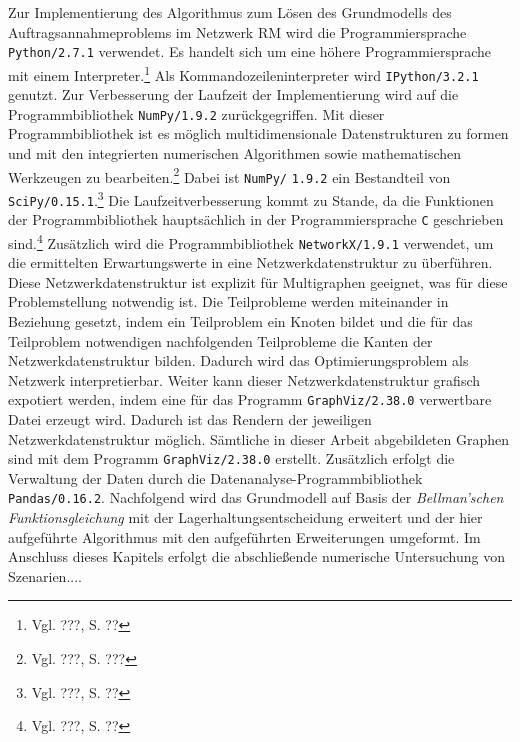 Zur Implementierung des Algorithmus zum Lösen des Grundmodells des Auftragsannahmeproblems im Netzwerk RM wird die Programmiersprache \texttt{Python/2.7.1} verwendet. Es handelt sich um eine höhere Programmiersprache mit einem Interpreter.\footnote{Vgl. ???, S. ??} Als  Kommandozeileninterpreter wird \texttt{IPython/3.2.1} genutzt. Zur Verbesserung der Laufzeit der Implementierung wird auf die Programmbibliothek \texttt{NumPy/}\texttt{1.9.2} zurückgegriffen. Mit dieser Programmbibliothek ist es möglich multidimensionale Datenstrukturen zu formen und mit den integrierten numerischen Algorithmen sowie mathematischen Werkzeugen zu bearbeiten.\footnote{Vgl. ???, S. ???} Dabei ist \texttt{NumPy/} \texttt{1.9.2} ein Bestandteil von \texttt{SciPy/0.15.1}.\footnote{Vgl. ???, S. ??} Die Laufzeitverbesserung kommt zu Stande, da die Funktionen der Programmbibliothek hauptsächlich in der Programmiersprache \texttt{C} geschrieben sind.\footnote{Vgl. ???, S. ??} Zusätzlich wird die Programmbibliothek \texttt{NetworkX/1.9.1} verwendet, um die ermittelten Erwartungswerte in eine Netzwerkdatenstruktur zu überführen. Diese Netzwerkdatenstruktur ist explizit für Multigraphen geeignet, was für diese Problemstellung notwendig ist. Die Teilprobleme werden miteinander in Beziehung gesetzt, indem ein Teilproblem ein Knoten bildet und die für das Teilproblem notwendigen nachfolgenden Teilprobleme die Kanten der Netzwerkdatenstruktur bilden. Dadurch wird das Optimierungsproblem als Netzwerk interpretierbar. Weiter kann dieser Netzwerkdatenstruktur grafisch expotiert werden, indem eine für das Programm \texttt{GraphViz/2.38.0} verwertbare Datei erzeugt wird. Dadurch ist das Rendern der jeweiligen Netzwerkdatenstruktur möglich. Sämtliche in dieser Arbeit abgebildeten Graphen sind mit dem Programm \texttt{GraphViz/2.38.0} erstellt. Zusätzlich erfolgt die Verwaltung der Daten durch die Datenanalyse-Programmbibliothek \texttt{Pandas/0.16.2}. Nachfolgend wird das Grundmodell auf Basis der \textit{Bellman'schen Funktionsgleichung} mit der Lagerhaltungsentscheidung erweitert und der hier aufgeführte Algorithmus mit den aufgeführten Erweiterungen umgeformt. Im Anschluss dieses Kapitels erfolgt die abschließende numerische Untersuchung von Szenarien....



